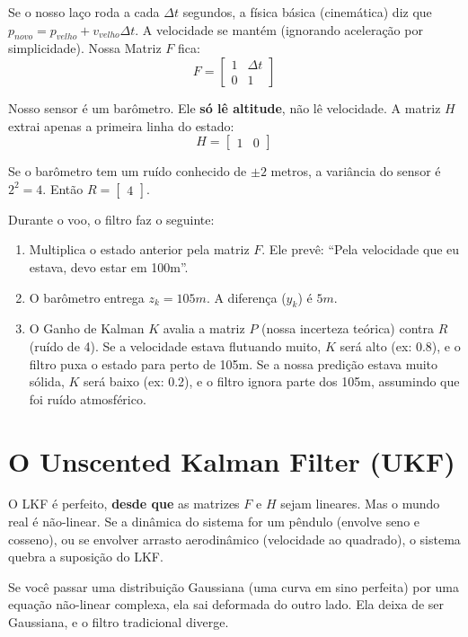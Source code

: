 \documentclass[12pt,a4paper]{article}
\begin{document}
Se o nosso laço roda a cada $\Delta t$ segundos, a física básica (cinemática) diz que $p_{novo} = p_{velho} + v_{velho} \Delta t$. A velocidade se mantém (ignorando aceleração por simplicidade). Nossa Matriz $F$ fica:
$$F = \begin{bmatrix} 1 & \Delta t \\ 0 & 1 \end{bmatrix}$$

Nosso sensor é um barômetro. Ele \textbf{só lê altitude}, não lê velocidade. A matriz $H$ extrai apenas a primeira linha do estado:
$$H = \begin{bmatrix} 1 & 0 \end{bmatrix}$$

Se o barômetro tem um ruído conhecido de $\pm 2$ metros, a variância do sensor é $2^2 = 4$. Então $R = \begin{bmatrix} 4 \end{bmatrix}$.

Durante o voo, o filtro faz o seguinte:
\begin{enumerate}
    \item Multiplica o estado anterior pela matriz $F$. Ele prevê: ``Pela velocidade que eu estava, devo estar em 100m''.
    \item O barômetro entrega $z_k = 105m$. A diferença ($y_k$) é $5m$.
    \item O Ganho de Kalman $K$ avalia a matriz $P$ (nossa incerteza teórica) contra $R$ (ruído de 4). Se a velocidade estava flutuando muito, $K$ será alto (ex: 0.8), e o filtro puxa o estado para perto de 105m. Se a nossa predição estava muito sólida, $K$ será baixo (ex: 0.2), e o filtro ignora parte dos 105m, assumindo que foi ruído atmosférico.
\end{enumerate}

\section{O Unscented Kalman Filter (UKF)}

O LKF é perfeito, \textbf{desde que} as matrizes $F$ e $H$ sejam lineares. Mas o mundo real é não-linear. Se a dinâmica do sistema for um pêndulo (envolve seno e cosseno), ou se envolver arrasto aerodinâmico (velocidade ao quadrado), o sistema quebra a suposição do LKF.

Se você passar uma distribuição Gaussiana (uma curva em sino perfeita) por uma equação não-linear complexa, ela sai deformada do outro lado. Ela deixa de ser Gaussiana, e o filtro tradicional diverge.
\end{document}
